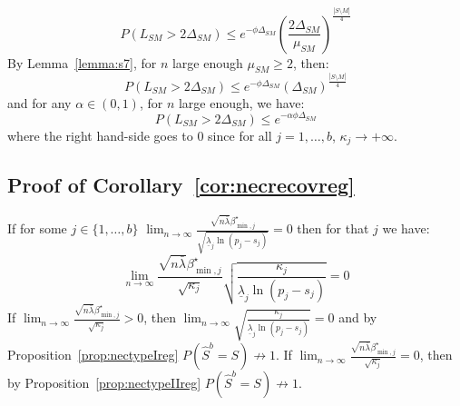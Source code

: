 \documentclass[aos]{imsart}
\theoremstyle{plain}
\begin{document}
\begin{supplement}
\begin{equation}\label{eq:randomeqeee}
    P(L_{SM}> 2\Delta_{SM}) \leq e^{-\phi\Delta_{SM}}\left(\frac{2\Delta_{SM}}{\mu_{SM}}\right)^{\frac{|S\setminus M|}{4}}
\end{equation} 
By Lemma~\ref{lemma:s7}, for $n$ large enough $\mu_{SM} \geq 2$, then:
\begin{equation}\label{eq:randomeqeee}
    P(L_{SM}> 2\Delta_{SM}) \leq e^{-\phi\Delta_{SM}}\left(\Delta_{SM}\right)^{\frac{|S\setminus M|}{4}}
\end{equation} 
and for any $\alpha\in(0,1)$, for $n$ large enough, we have:
\begin{equation}\label{eq:randomeqeee}
    P(L_{SM}> 2\Delta_{SM}) \leq e^{-\alpha\phi\Delta_{SM}}
\end{equation} 
where the right hand-side goes to 0 since for all $j=1,\ldots,b$, $\kappa_j \to +\infty$. 

\subsection{Proof of Corollary~\ref{cor:necrecovreg}}
If for some $j\in\{1,\ldots,b\}$ $\lim_{n\to\infty}\frac{\sqrt{n\bar{\lambda}}\beta_{\min,j}^{\star}}{\sqrt{\underline{\lambda}_j\ln(p_j-s_j)}} = 0$ then for that $j$ we have:
$$\lim_{n\to\infty}\frac{\sqrt{n\bar{\lambda}}\beta_{\min,j}^{\star}}{\sqrt{\kappa_j}}\sqrt{\frac{\kappa_j}{\underline{\lambda}_j\ln(p_j-s_j)}} = 0$$
If $\lim_{n\to\infty}\frac{\sqrt{n\bar{\lambda}}\beta_{\min,j}^{\star}}{\sqrt{\kappa_j}}>0$, then $\lim_{n\to\infty}\sqrt{\frac{\kappa_j}{\underline{\lambda}_j\ln(p_j-s_j)}} = 0$ and by Proposition~\ref{prop:nectypeIreg} $P(\hat{S}^b=S)\not\to1$. If $\lim_{n\to\infty}\frac{\sqrt{n\bar{\lambda}}\beta_{\min,j}^{\star}}{\sqrt{\kappa_j}}=0$, then by Proposition~\ref{prop:nectypeIIreg} $P(\hat{S}^b=S)\not\to1$.



\end{supplement}
\end{document}

